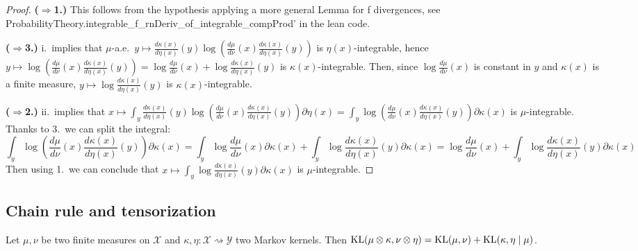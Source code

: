 \begin{proof}
{\bfseries($\Rightarrow$1.)} This follows from the hypothesis applying a more general Lemma for f divergences, see ProbabilityTheory.integrable\_f\_rnDeriv\_of\_integrable\_compProd' in the lean code.

{\bfseries($\Rightarrow$3.)} i.\ implies that $\mu$-a.e.\ $y \mapsto \frac{d \kappa(x)}{d \eta(x)}(y) \log \left(\frac{d \mu}{d \nu}(x) \frac{d \kappa(x)}{d \eta(x)}(y) \right)$ is $\eta(x)$-integrable, hence $y \mapsto \log \left(\frac{d \mu}{d \nu}(x) \frac{d \kappa(x)}{d \eta(x)}(y) \right) = \log \frac{d \mu}{d \nu}(x) + \log \frac{d \kappa(x)}{d \eta(x)}(y)$ is $\kappa(x)$-integrable. Then, since $\log \frac{d \mu}{d \nu}(x)$ is constant in $y$ and $\kappa(x)$ is a finite measure, $y \mapsto \log \frac{d \kappa(x)}{d \eta(x)}(y)$ is $\kappa(x)$-integrable.

{\bfseries($\Rightarrow$2.)} ii.\ implies that $x \mapsto  \int_y \frac{d \kappa(x)}{d \eta(x)}(y) \log \left(\frac{d \mu}{d \nu}(x) \frac{d \kappa(x)}{d \eta(x)}(y) \right) \partial \eta (x) = \int_y \log \left(\frac{d \mu}{d \nu}(x) \frac{d \kappa(x)}{d \eta(x)}(y) \right) \partial \kappa (x)$ is $\mu$-integrable. 
Thanks to 3.\ we can split the integral:
$$\int_y \log \left(\frac{d \mu}{d \nu}(x) \frac{d \kappa(x)}{d \eta(x)}(y) \right) \partial \kappa (x)
= \int_y \log \frac{d \mu}{d \nu}(x) \partial \kappa (x) + \int_y \log \frac{d \kappa(x)}{d \eta(x)}(y) \partial \kappa (x) = \log \frac{d \mu}{d \nu}(x) + \int_y \log \frac{d \kappa(x)}{d \eta(x)}(y) \partial \kappa (x)$$
Then using 1.\ we can conclude that $x \mapsto \int_y \log \frac{d \kappa(x)}{d \eta(x)}(y) \partial \kappa (x)$ is $\mu$-integrable.

\end{proof}



\subsection{Chain rule and tensorization}

\begin{theorem}
  \label{thm:kl_compProd}
  \leanok
  Let $\mu, \nu$ be two finite measures on $\mathcal X$ and $\kappa, \eta : \mathcal X \rightsquigarrow \mathcal Y$ two Markov kernels.
  Then $\operatorname{KL}(\mu \otimes \kappa, \nu \otimes \eta) = \operatorname{KL}(\mu, \nu) + \operatorname{KL}(\kappa, \eta \mid \mu)$.
\end{theorem}

